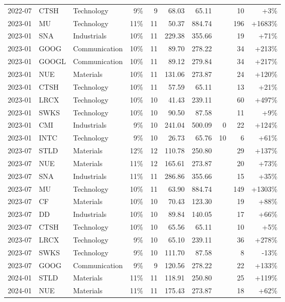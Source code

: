 \documentclass[11pt,a4paper]{article}
\begin{document}
{\begin{longtable}{l l l r r r r r r r}
2022-07 & CTSH & Technology & 9\% & 9 & 68.03 & 65.11 &  & 10 & +3\% \\
2023-01 & MU & Technology & 11\% & 11 & 50.37 & 884.74 &  & 196 & +1683\% \\
2023-01 & SNA & Industrials & 10\% & 11 & 229.38 & 355.66 &  & 19 & +71\% \\
2023-01 & GOOG & Communication & 10\% & 11 & 89.70 & 278.22 &  & 34 & +213\% \\
2023-01 & GOOGL & Communication & 10\% & 11 & 89.12 & 279.84 &  & 34 & +217\% \\
2023-01 & NUE & Materials & 10\% & 11 & 131.06 & 273.87 &  & 24 & +120\% \\
2023-01 & CTSH & Technology & 10\% & 11 & 57.59 & 65.11 &  & 13 & +21\% \\
2023-01 & LRCX & Technology & 10\% & 10 & 41.43 & 239.11 &  & 60 & +497\% \\
2023-01 & SWKS & Technology & 10\% & 10 & 90.50 & 87.58 &  & 11 & +9\% \\
2023-01 & CMI & Industrials & 9\% & 10 & 241.04 & 500.09 & 0 & 22 & +124\% \\
2023-01 & INTC & Technology & 9\% & 10 & 26.73 & 65.76 & 10 & 6 & +61\% \\
2023-07 & STLD & Materials & 12\% & 12 & 110.78 & 250.80 &  & 29 & +137\% \\
2023-07 & NUE & Materials & 11\% & 12 & 165.61 & 273.87 &  & 20 & +73\% \\
2023-07 & SNA & Industrials & 11\% & 11 & 286.86 & 355.66 &  & 15 & +35\% \\
2023-07 & MU & Technology & 10\% & 11 & 63.90 & 884.74 &  & 149 & +1303\% \\
2023-07 & CF & Materials & 10\% & 10 & 70.43 & 123.30 &  & 19 & +88\% \\
2023-07 & DD & Industrials & 10\% & 10 & 89.84 & 140.05 &  & 17 & +66\% \\
2023-07 & CTSH & Technology & 10\% & 10 & 65.56 & 65.11 &  & 10 & +5\% \\
2023-07 & LRCX & Technology & 9\% & 10 & 65.10 & 239.11 &  & 36 & +278\% \\
2023-07 & SWKS & Technology & 9\% & 10 & 111.70 & 87.58 &  & 8 & -13\% \\
2023-07 & GOOG & Communication & 9\% & 9 & 120.56 & 278.22 &  & 22 & +133\% \\
2024-01 & STLD & Materials & 11\% & 11 & 118.91 & 250.80 &  & 25 & +119\% \\
2024-01 & NUE & Materials & 11\% & 11 & 175.43 & 273.87 &  & 18 & +62\% \\

\end{longtable}}
\end{document}

